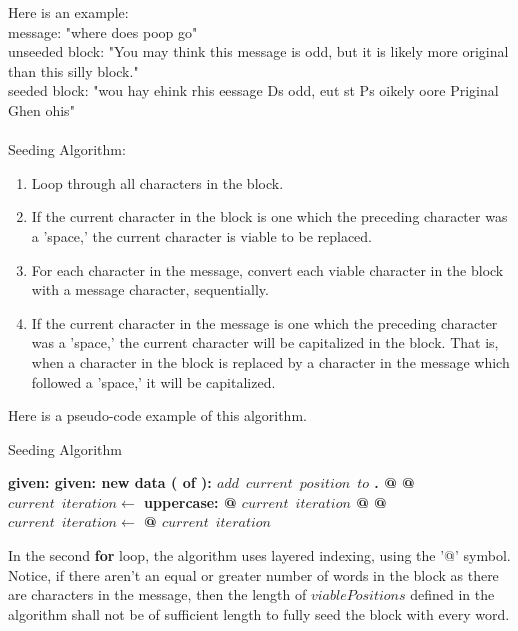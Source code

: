 \documentclass[12]{article}
\begin{document}
   Here is an example:\\
message: "where does poop go"\\
unseeded block: "You may think this message is odd, but it is likely more original than this silly block."\\
seeded block: "wou hay ehink rhis eessage Ds odd, eut st Ps oikely oore Priginal Ghen ohis"\\
\\
Seeding Algorithm:
\begin{enumerate}
\item Loop through all characters in the block.
\item If the current character in the block is one which the preceding character was a 'space,' the current character is viable to be replaced.
\item For each character in the message, convert each viable character in the block with a message character, sequentially.
\item If the current character in the message is one which the preceding character was a 'space,' the current character will be capitalized in the block. That is, when a character in the block is replaced by a character in the message which followed a 'space,' it will be capitalized.
\end{enumerate}

	Here is a pseudo-code example of this algorithm.
\begin{algorithm}
\caption{Seeding Algorithm}\label{euclid}
\begin{algorithmic}
\State \bf{given:} 
\State \bf{given:} 
\State \bf{new data ( \bf{of} \bf{):}} 
		\State $add\,\,\,current\,\,\,position\,\,\,to$ .
	\EndIf
\EndFor
{}
		\State {} @  @ $current\,\,\,iteration\gets$ \bf{uppercase:}   @ $current\,\,\,iteration$
	\Else
		\State {} @  @ $current\,\,\,iteration\gets$  @ $current\,\,\,iteration$
	\EndIf
\EndFor
\EndProcedure
\end{algorithmic}
\end{algorithm}

	In the second \textbf{for} loop, the algorithm uses layered indexing, using the '@' symbol. Notice, if there aren't an equal or greater number of words in the block as there are characters in the message, then the length of $viablePositions$ defined in the algorithm shall not be of sufficient length to fully seed the block with every word.
\end{document}
